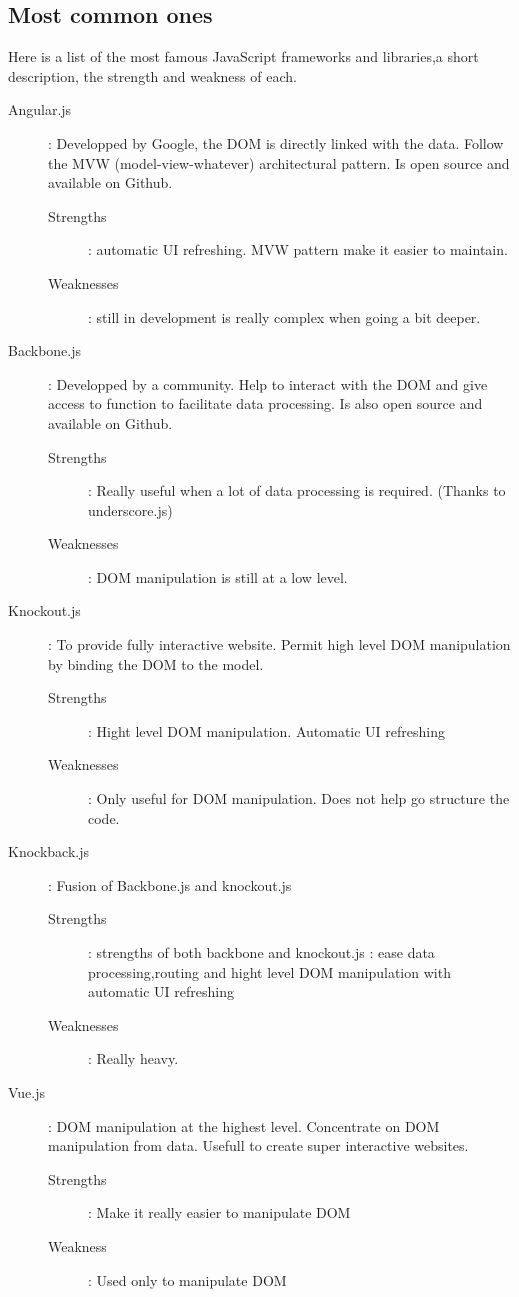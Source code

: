 \documentclass[12pt]{report}%
\begin{document}
\subsection{Most common ones}
Here is a list of the most famous JavaScript frameworks and libraries,a short description,  the strength and weakness of each.

\begin{description}
	\item[Angular.js] : Developped by Google, the DOM is directly linked with the data. Follow the MVW (model-view-whatever) architectural pattern. Is open source and available on Github. \begin{description}
		\item[Strengths] : automatic UI refreshing. MVW pattern make it easier to maintain.
		\item[Weaknesses] : still in development is really complex when going a bit deeper.
	\end{description}
	\item[Backbone.js] : Developped by a community. Help to interact with the DOM and give access to function to facilitate data processing. Is also open source and available on Github. \begin{description}
		\item[Strengths] : Really useful when a lot of data processing is required. (Thanks to underscore.js)
		\item[Weaknesses] : DOM manipulation is still at a low level.
	\end{description}
	\item[Knockout.js] : To provide fully interactive website. Permit high level DOM manipulation by binding the DOM to the model. \begin{description}
	\item[Strengths] : Hight level DOM manipulation. Automatic UI refreshing
	\item[Weaknesses] : Only useful for DOM manipulation. Does not help go structure the code. 
	\end{description}
	\item[Knockback.js] : Fusion of Backbone.js and knockout.js \begin{description}
		\item[Strengths] : strengths of both backbone and knockout.js : ease data processing,routing and hight level DOM manipulation with automatic UI refreshing
		\item[Weaknesses] : Really heavy.
	\end{description}
	\item[Vue.js] : DOM manipulation at the highest level. Concentrate on DOM manipulation from data. Usefull to create super interactive websites. \begin{description}
		\item[Strengths] : Make it really easier to manipulate DOM
		\item[Weakness] : Used only to manipulate DOM
	\end{description}
\end{description}
\end{document}
